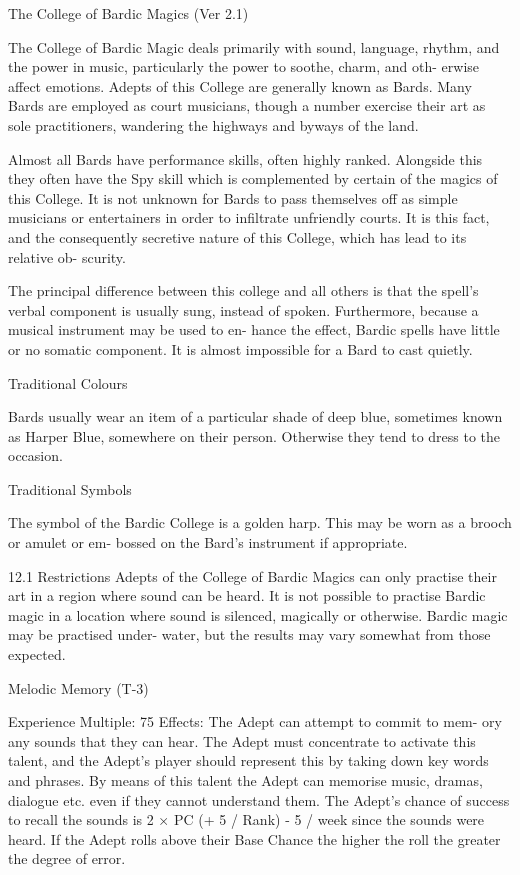 \begin{Chapter}{The College of Bardic Magics (Ver 2.1)}

The College of Bardic Magic deals primarily with sound, language,
rhythm, and the power in music, particularly the power to soothe,
charm, and oth- erwise affect emotions.  Adepts of this College are
generally known as Bards.  Many Bards are employed as court musicians,
though a number exercise their art as sole practitioners, wandering
the highways and byways of the land.

Almost  all  Bards  have  performance  skills,  often 
highly  ranked.  Alongside  this  they  often  have  the 
Spy skill which is complemented by certain of the 
magics of this College. It is not unknown for Bards 
to  pass  themselves  off  as  simple  musicians  or 
entertainers  in  order  to infiltrate unfriendly  courts. 
It is this fact, and the consequently secretive nature 
of  this  College,  which  has  lead  to  its  relative  ob-
scurity. 

The  principal  difference  between  this  college  and 
all  others  is  that  the  spell’s  verbal  component  is 
usually  sung,  instead  of  spoken.  Furthermore, 
because  a  musical  instrument  may  be  used  to  en-
hance  the  effect,  Bardic  spells  have  little  or  no 
somatic  component.  It  is  almost  impossible  for  a 
Bard to cast quietly. 

Traditional Colours 

Bards usually wear an item of a particular shade of 
deep  blue,  sometimes  known  as  Harper  Blue, 
somewhere on their person. Otherwise they tend to 
dress to the occasion. 

Traditional Symbols 

The symbol of the Bardic College is a golden harp. 
This  may  be  worn  as  a  brooch  or  amulet  or  em-
bossed on the Bard’s instrument if appropriate. 

12.1 Restrictions 
Adepts  of  the  College  of  Bardic  Magics  can  only 
practise  their  art  in  a  region  where  sound  can  be 
heard. It is not possible to practise Bardic magic in 
a  location  where  sound  is  silenced,  magically  or 
otherwise.  Bardic  magic  may  be  practised  under-
water,  but  the  results  may  vary  somewhat  from 
those expected. 

Melodic Memory (T-3) 

Experience Multiple: 75 
Effects: The Adept can attempt to commit to mem-
ory any sounds that they can hear. The Adept must 
concentrate  to  activate  this  talent,  and  the  Adept’s 
player  should  represent  this  by  taking  down  key 
words  and  phrases.  By  means  of  this  talent  the 
Adept  can  memorise  music,  dramas,  dialogue  etc. 
even  if  they  cannot  understand  them.  The  Adept’s 
chance of success to recall the sounds is 2 × PC (+ 
5 / Rank) - 5 / week since the sounds were heard. If 
the Adept rolls above their Base Chance the higher 
the roll the greater the degree of error. 


\end{Chapter}
